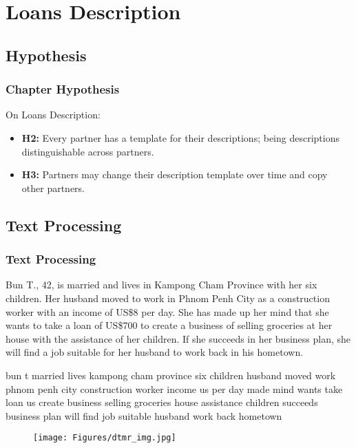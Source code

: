 \documentclass{beamer}
\begin{document}
\section{Loans Description}
\subsection{Hypothesis}
\begin{frame}\frametitle{Chapter Hypothesis}
\begin{block}{On Loans Description:}
\begin{itemize}
\item \textbf{H2:} Every partner has a template for their descriptions; being descriptions distinguishable across partners.
\item \textbf{H3:} Partners may change their description template over time and copy other partners.
\end{itemize}
\end{block}
\end{frame}

\subsection{Text Processing}
\begin{frame}\frametitle{Text Processing}
\tiny{
\begin{tcolorbox}
Bun T., 42, is married and lives in Kampong Cham Province with her six children. Her husband moved to work in Phnom Penh City as a construction worker with an income of US\$8 per day. She has made up her mind that she wants to take a loan of US\$700 to create a business of selling groceries at her house with the assistance of her children. If she succeeds in her business plan, she will find a job suitable for her husband to work back in his hometown.
\end{tcolorbox}

\begin{tcolorbox}
bun t married lives kampong cham province six children husband moved work  phnom penh city   construction worker income  us per day made  mind wants take loan  us  create  business selling groceries house assistance children succeeds business plan  will find  job suitable husband  work back hometown
\end{tcolorbox}
}

\begin{figure}
\texttt{[image: Figures/dtmr\_img.jpg]}%
\end{figure}
\end{frame}
\end{document}
